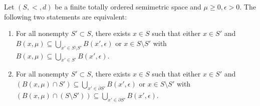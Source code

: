 \begin{theorem}
\label{thm:existence-total}
    Let $(S, <, d)$ be a finite totally ordered semimetric space and $\mu \geq 0, \epsilon > 0$. The following two statements are equivalent:
    \begin{enumerate}
        \item For all nonempty $S' \subset S$, there exists $x \in S$ such that either $x \in S'$ and $B(x,\mu) \subseteq \bigcup_{x' \in S \setminus S'} B(x', \epsilon)$ or $x \in S \setminus S'$ with $B(x,\mu) \subseteq \bigcup_{x' \in S'} B(x', \epsilon)$.
        \item For all nonempty $S' \subset S$, there exists $x \in S$ such that either $x \in S'$ and $(B(x,\mu) \cap S') \subseteq \bigcup_{x' \in \overline{\partial}S'} B(x', \epsilon)$ or $x \in S \setminus S'$ with $(B(x,\mu) \cap (S \setminus S')) \subseteq \bigcup_{x' \in \partial S'} B(x', \epsilon)$.
    \end{enumerate}
\end{theorem}
